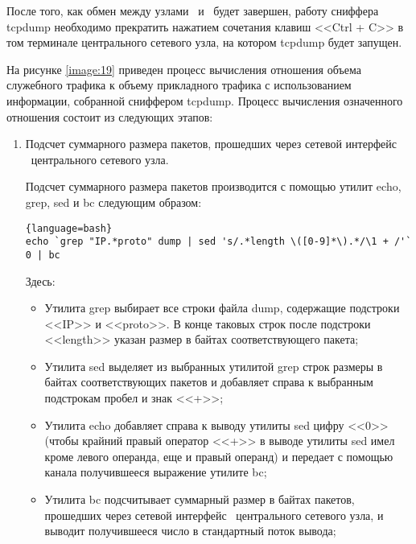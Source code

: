	После того, как обмен между узлами \first\ и \second\ будет завершен, работу сниффера tcpdump необходимо прекратить
	нажатием сочетания клавиш <<Ctrl + C>> в том терминале центрального сетевого узла, на котором tcpdump будет запущен.

	На рисунке \ref{image:19} приведен процесс вычисления отношения объема служебного трафика к объему прикладного
	трафика с использованием информации, собранной сниффером tcpdump. Процесс вычисления означенного отношения состоит
	из следующих этапов:

	\begin{enumerate}

		\item Подсчет суммарного размера пакетов, прошедших через сетевой интерфейс \midethf\ центрального сетевого узла.

		Подсчет суммарного размера пакетов производится с помощью утилит echo, grep, sed и bc следующим образом:

		\begin{lstlisting}{language=bash}
echo `grep "IP.*proto" dump | sed 's/.*length \([0-9]*\).*/\1 + /'` 0 | bc
		\end{lstlisting}
		
		Здесь:

		\begin{itemize}

			\item Утилита grep выбирает все строки файла dump, содержащие подстроки <<IP>> и <<proto>>.
			В конце таковых строк после подстроки <<length>> указан размер в байтах соответствующего пакета;

			\item Утилита sed выделяет из выбранных утилитой grep строк размеры в байтах соответствующих пакетов и
			добавляет справа к выбранным подстрокам	пробел и знак <<+>>;

			\item Утилита echo добавляет справа к выводу утилиты sed цифру <<0>> (чтобы крайний правый оператор <<+>>
			в выводе утилиты sed имел кроме левого операнда, еще и правый операнд) и передает с помощью канала
			получившееся выражение утилите bc;

			\item Утилита bc подсчитывает суммарный размер в байтах пакетов, прошедших через сетевой интерфейс
			\midethf\ центрального сетевого узла, и выводит получившееся число в стандартный поток вывода;

		\end{itemize}


\end{enumerate}
